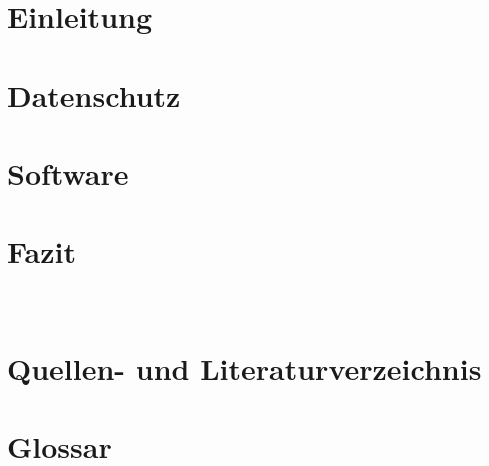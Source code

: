 \documentclass[11pt]{article}
\begin{document}

\pagebreak
\tableofcontents
\pagebreak
\section{Einleitung}

\pagebreak
\section{Datenschutz}

\pagebreak
\section{Software}

\pagebreak
%
\section{Fazit}
\\
\pagebreak
%
\section{Quellen- und Literaturverzeichnis}

\pagebreak
\section{Glossar}

\pagebreak
\end{document}
